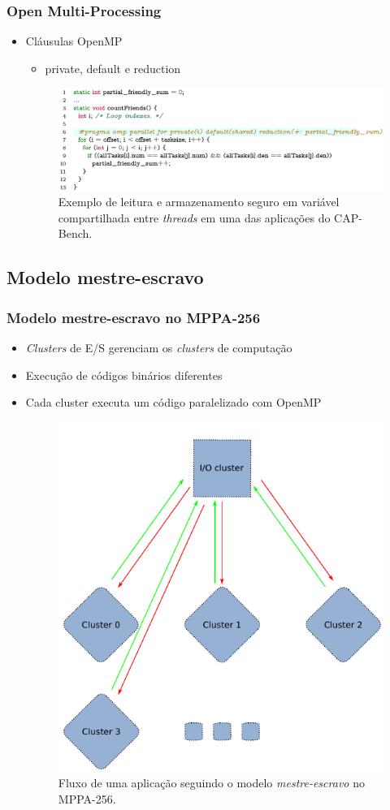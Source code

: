 \documentclass[xcolor={table}]{beamer}
\begin{document}
\begin{frame}\frametitle{Open Multi-Processing}
    \begin{itemize}
        \item Cláusulas OpenMP
        \begin{itemize}
            \item private, default e reduction
        \end{itemize}
        \begin{figure}[tb]
          \centering
          \includegraphics[width=1\linewidth, keepaspectratio]{figs/reductionloop.png}
          \caption{Exemplo de leitura e armazenamento seguro em variável compartilhada entre \textit{threads} em uma das aplicações do CAP-Bench.}
          \label{lst:reductionloop}
        \end{figure}
    \end{itemize}
\end{frame}

\subsection{Modelo mestre-escravo}
\begin{frame}\frametitle{Modelo mestre-escravo no MPPA-256}
    \begin{itemize}
        \item \textit{Clusters} de E/S gerenciam os \textit{clusters} de computação
        \item Execução de códigos binários diferentes
        \item Cada cluster executa um código paralelizado com OpenMP 
        \begin{figure}[tb]
          \centering
          \includegraphics[width=.4\linewidth, keepaspectratio]{figs/mppamasterslave.pdf}
          \caption{Fluxo de uma aplicação seguindo o modelo \textit{mestre-escravo} no MPPA-256.}
          \label{fig:masterslave}
        \end{figure}
    \end{itemize}
\end{frame}
\end{document}
